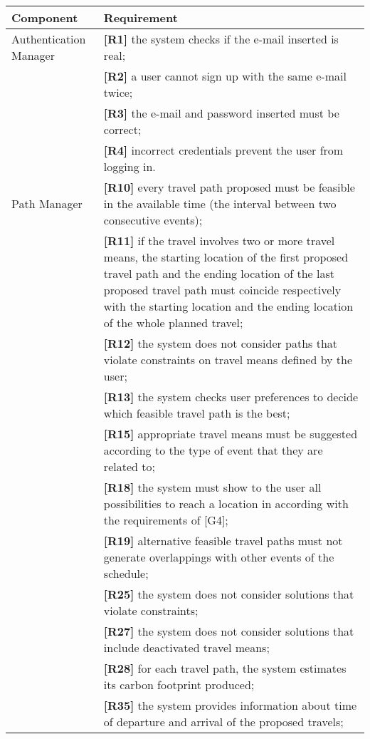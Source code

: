 \begin{center}
	\begin{longtable}{ | p{} | p{} | }
		\hline
		\textbf{Component} & \textbf{Requirement}\\
		\hline
		Authentication Manager & \textbf{[R1]} the system checks if the e-mail inserted is real;\\
		& \textbf{[R2]} a user cannot sign up with the same e-mail twice;\\
		& \textbf{[R3]} the e-mail and password inserted must be correct;\\
		& \textbf{[R4]} incorrect credentials prevent the user from logging in.\\
		\hline
		Path Manager & \textbf{[R10]} every travel path proposed must be feasible in the available time (the interval between two consecutive events);\\
		& \textbf{[R11]} if the travel involves two or more travel means, the starting location of the first proposed travel path and the ending location of the last proposed travel path must coincide respectively with the starting location and the ending location of the whole planned travel;\\
		& \textbf{[R12]} the system does not consider paths that violate constraints on travel means defined by the user;\\
		& \textbf{[R13]} the system checks user preferences to decide which feasible travel path is the best;\\
		& \textbf{[R15]} appropriate travel means must be suggested according to the type of event that they are related to; \\
		& \textbf{[R18]} the system must show to the user all possibilities to reach a location in according with the requirements of [G4];\\
		& \textbf{[R19]} alternative feasible travel paths must not generate overlappings with other events of the schedule;\\
		& \textbf{[R25]} the system does not consider solutions that violate constraints;\\
		& \textbf{[R27]} the system does not consider solutions that include deactivated travel means;\\
		& \textbf{[R28]} for each travel path, the system estimates its carbon footprint produced;\\
		& \textbf{[R35]} the system provides information about time of departure and arrival of the proposed travels;\\

\end{longtable}
\end{center}
